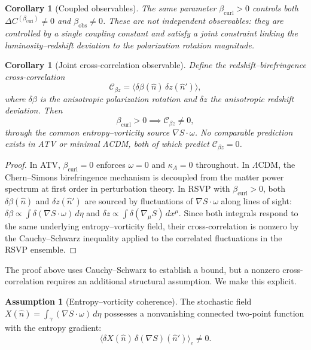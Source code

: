 \documentclass[12pt,a4paper]{article}
\theoremstyle{plain}
\newtheorem{corollary}[theorem]{Corollary}
\theoremstyle{definition}
\newtheorem{assumption}[theorem]{Assumption}
\theoremstyle{remark}
\newcommand{\Cbz}{\mathcal{C}_{\beta z}}
\newcommand{\bcurl}{\beta_{\mathrm{curl}}}
\newcommand{\kA}{\kappa_A}
\begin{document}
\begin{corollary}[Coupled observables]
\label{cor:E1}
The same parameter $\bcurl > 0$ controls both $\Delta C^{(\bcurl)}\neq 0$
and $\beta_{\mathrm{obs}}\neq 0$. These are not independent observables:
they are controlled by a single coupling constant and satisfy a joint constraint
linking the luminosity--redshift deviation to the polarization rotation magnitude.
\end{corollary}

\begin{corollary}[Joint cross-correlation observable]
\label{cor:E2}
Define the redshift--birefringence cross-correlation
\begin{equation}
  \Cbz = \bigl\langle\delta\beta(\hat{n})\,\delta z(\hat{n}')\bigr\rangle,
  \label{eq:C_bz}
\end{equation}
where $\delta\beta$ is the anisotropic polarization rotation and $\delta z$ the
anisotropic redshift deviation. Then
\begin{equation}
  \bcurl > 0 \implies \Cbz\neq 0,
  \label{eq:C_bz_nonzero}
\end{equation}
through the common entropy--vorticity source $\nabla S\cdot\omega$. No comparable
prediction exists in ATV or minimal $\Lambda$CDM, both of which predict $\Cbz = 0$.
\end{corollary}

\begin{proof}
In ATV, $\bcurl = 0$ enforces $\omega = 0$ and $\kA = 0$ throughout. In $\Lambda$CDM,
the Chern--Simons birefringence mechanism is decoupled from the matter power spectrum
at first order in perturbation theory. In RSVP with $\bcurl > 0$, both $\delta\beta(\hat{n})$
and $\delta z(\hat{n}')$ are sourced by fluctuations of $\nabla S\cdot\omega$ along
lines of sight: $\delta\beta\propto\int\delta(\nabla S\cdot\omega)\,d\eta$ and
$\delta z\propto\int\delta(\nabla_\mu S)\,dx^\mu$. Since both integrals respond to
the same underlying entropy--vorticity field, their cross-correlation is nonzero by the
Cauchy--Schwarz inequality applied to the correlated fluctuations in the RSVP ensemble.
\end{proof}

The proof above uses Cauchy--Schwarz to establish a bound, but a nonzero
cross-correlation requires an additional structural assumption. We make this explicit.

\begin{assumption}[Entropy--vorticity coherence]
\label{ass:coherence}
The stochastic field $X(\hat{n}) = \int_\gamma (\nabla S\cdot\omega)\,d\eta$
possesses a nonvanishing connected two-point function with the entropy gradient:
\begin{equation}
  \bigl\langle\delta X(\hat{n})\,\delta(\nabla S)(\hat{n}')\bigr\rangle_c \neq 0.
  \label{eq:coherence_assumption}
\end{equation}
\end{assumption}
\end{document}
